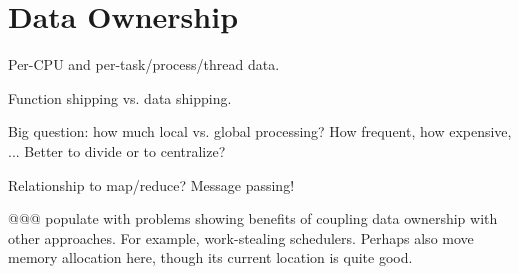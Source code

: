 
\chapter{Data Ownership}

Per-CPU and per-task/process/thread data.

Function shipping vs. data shipping.

Big question: how much local vs. global processing?  How frequent,
how expensive, ...  Better to divide or to centralize?

Relationship to map/reduce?  Message passing!

@@@ populate with problems showing benefits of coupling data ownership
with other approaches.
For example, work-stealing schedulers.
Perhaps also move memory allocation here, though its current location
is quite good.
